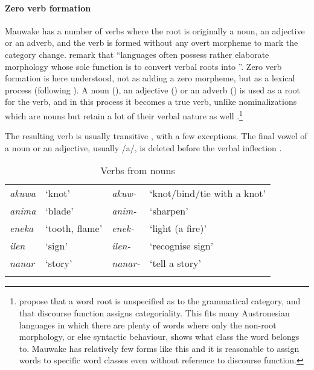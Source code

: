 \paragraph{Zero verb formation}\label{sec:3.8.2.2.1}
{}
Mauwake has a number of verbs where the root is originally a noun, an adjective or an adverb, and the verb is formed without any overt morpheme to mark the category change. \citet[745]{HopperEtAl1984} remark that ``{languages often possess rather elaborate morphology whose sole function is to convert verbal roots into}  ''. Zero verb formation is here understood, not as adding a zero morpheme, but as a lexical process (following \citealt[224]{Payne1997}). A noun (), an adjective () or an adverb () is used as a root for the verb, and in this process it becomes a true verb, unlike nominalizations which are nouns but retain a lot of their verbal nature as well \citep[747]{HopperEtAl1984}%
.\footnote{\citet{HopperEtAl1984} propose that a word root is unspecified as to the grammatical category, and that discourse function assigns categoriality. This fits many Austronesian languages in which there are plenty of words where only the non-root morphology, or else syntactic behaviour, shows what class the word belongs to. Mauwake has relatively few forms like this and it is reasonable to assign words to specific word classes even without reference to discourse function.}

The resulting verb is usually transitive , with a few exceptions. The final vowel of a noun or an adjective, usually /a/, is deleted before the verbal inflection . 

\begin{table}
\caption{Verbs from nouns}
\label{tab:3:verbsfromnouns}
 
\begin{tabular}{>{\itshape}ll>{\itshape}ll}
\mytoprule
akuwa &`knot' &akuw- &`knot/bind/tie with a knot'\\
anima &`blade' &anim- &`sharpen'\\
eneka &`tooth, flame' &enek- &`light (a fire)'\\
ilen &`sign' &ilen- &`recognise sign'\\
nanar &`story' &nanar- &`tell a story'\\
\mybottomrule
\end{tabular}

\end{table}

